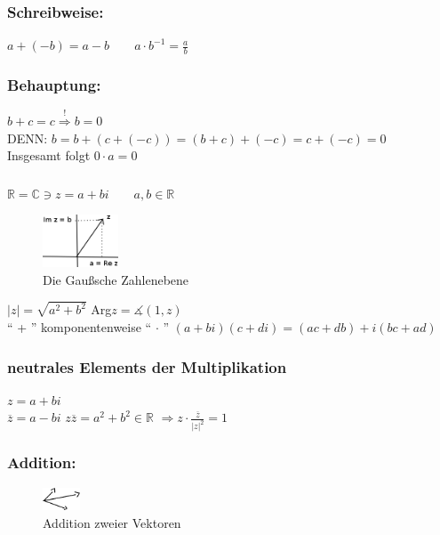 \subsubsection{Schreibweise:}
$ a+(-b) = a-b \qquad a\cdot b^{-1} = \frac{a}{b}$
%
%
%
\subsubsection{Behauptung:}
$b+c = c \mathop{\Rightarrow}\limits^{!} b = 0$\\
DENN: $b=b+(c+(-c))=(b+c)+(-c)=c+(-c)=0$\\
Insgesamt folgt $0 \cdot a = 0$  \\
%
%
%
\subsubsection{ }
$\mathbb{R} = \mathbb{C} \ni z = a+bi \qquad a,b \in \mathbb{R}$
\begin{figure}[H]
\centering
\includegraphics[width=0.2\textwidth]{mainmatter/chapter3/pics/gauszschezahlenebene.png}
\caption{Die Gaußsche Zahlenebene}
\end{figure}
$\vert z \vert = \sqrt{a^{2}+b^{2}}$ \qquad Arg$z=\measuredangle (1,z)$\\
 "` + "' komponentenweise "` $\cdot$ "' $(a+bi)(c+di)=(ac+db)+i(bc+ad)$\\
%
%
%
\subsubsection{neutrales Elements der Multiplikation}
$z=a+bi$\\
$\overline{z}=a-bi$
$z\overline{z}=a^{2}+b^{2} \in  \mathbb{R}$
$\Rightarrow z\cdot \frac{\overline{z}}{\vert z \vert^{2}} = 1$
%
%
%
\subsubsection{Addition:}
\begin{figure}[H]
\centering
\includegraphics[width=0.1\textwidth]{mainmatter/chapter3/pics/addition.png}
\caption{Addition zweier Vektoren}
\end{figure}
%
%
%
